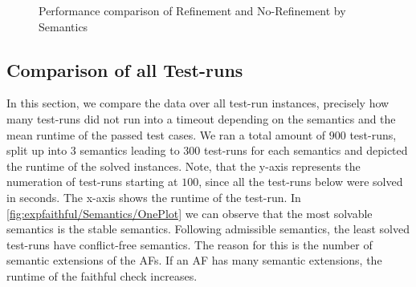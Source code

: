 \begin{figure}[H]
    \centering
    \caption{Performance comparison of Refinement and No-Refinement by Semantics}
    \label{fig:expfaithful/REFvsNOREF/OnePlot}
\end{figure}



\subsection{Comparison of all Test-runs}
In this section, we compare the data over all test-run instances, precisely how many test-runs did not run into a timeout depending on the semantics and the mean runtime of the passed test cases. We ran a total amount of $900$ test-runs, split up into $3$ semantics leading to $300$ test-runs for each semantics and depicted the runtime of the solved instances. Note, that the y-axis represents the numeration of test-runs starting at $100$, since all the test-runs below were solved in seconds. The x-axis shows the runtime of the test-run. In \cref{fig:expfaithful/Semantics/OnePlot} we can observe that the most solvable semantics is the stable semantics. Following admissible semantics, the least solved test-runs have conflict-free semantics. The reason for this is the number of semantic extensions of the AFs. If an AF has many semantic extensions, the runtime of the faithful check increases.


